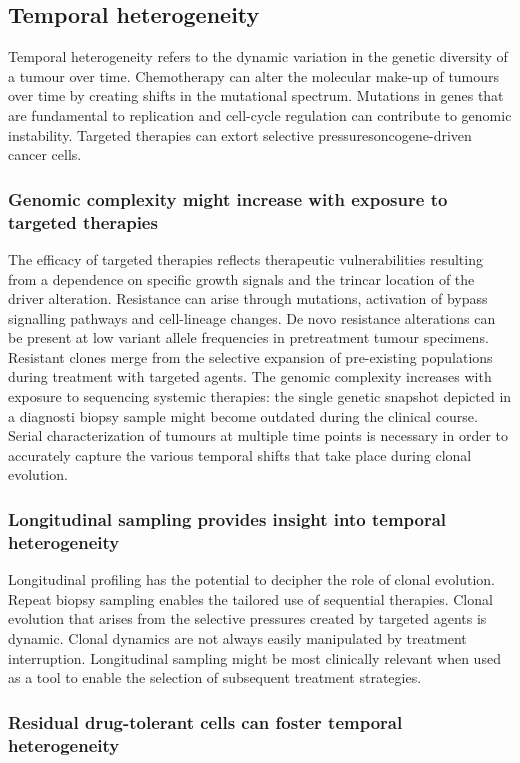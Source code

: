 	\subsection{Temporal heterogeneity}
	Temporal heterogeneity refers to the dynamic variation in the genetic diversity of a tumour over time.
	Chemotherapy can alter the molecular make-up of tumours over time by creating shifts in the mutational spectrum.
	Mutations in genes that are fundamental to replication and cell-cycle regulation can contribute to genomic instability.
	Targeted therapies can extort selective pressuresoncogene-driven cancer cells.

		\subsubsection{Genomic complexity might increase with exposure to targeted therapies}
		The efficacy of targeted therapies reflects therapeutic vulnerabilities resulting from a dependence on specific growth signals and the trincar location of the driver alteration.
		Resistance can arise through mutations, activation of bypass signalling pathways and cell-lineage changes.
		De novo resistance alterations can be present at low variant allele frequencies in pretreatment tumour specimens.
		Resistant clones merge from the selective expansion of pre-existing populations during treatment with targeted agents.
		The genomic complexity increases with exposure to sequencing systemic therapies: the single genetic snapshot depicted in a diagnosti biopsy sample might become outdated during the clinical course.
		Serial characterization of tumours at multiple time points is necessary in order to accurately capture the various temporal shifts that take place during clonal evolution.

		\subsubsection{Longitudinal sampling provides insight into temporal heterogeneity}
		Longitudinal profiling has the potential to decipher the role of clonal evolution.
		Repeat biopsy sampling enables the tailored use of sequential therapies.
		Clonal evolution that arises from the selective pressures created by targeted agents is dynamic.
		Clonal dynamics are not always easily manipulated by treatment interruption.
		Longitudinal sampling might be most clinically relevant when used as a tool to enable the selection of subsequent treatment strategies.

		\subsubsection{Residual drug-tolerant cells can foster temporal heterogeneity}

